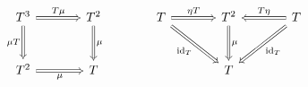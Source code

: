 \documentclass[border=6pt]{standalone}
\newcommand{\id}{\mathrm{id}}
\begin{document}
$
\begin{tikzcd}[column sep=large, row sep=large]
  T^3 \arrow[r, Rightarrow, "T\mu"] \arrow[d, Rightarrow, "\mu T"'] & T^2 \arrow[d, Rightarrow, "\mu"] &
  T \arrow[r, Rightarrow, "\eta T"] \arrow[dr, Rightarrow, "\id_T"'] & T^2 \arrow[d, Rightarrow, "\mu"] & T \arrow[l, Rightarrow, "T\eta"'] \arrow[dl, Rightarrow, "\id_T"] \\
  T^2 \arrow[r, Rightarrow, "\mu"'] & T & & T &
\end{tikzcd}
$
\end{document}
